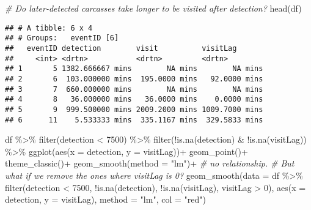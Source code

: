 \documentclass[
]{article}
\newenvironment{Shaded}{\begin{snugshade}}{\end{snugshade}}
\newcommand{\AttributeTok}[1]{\textcolor[rgb]{0.77,0.63,0.00}{#1}}
\newcommand{\CommentTok}[1]{\textcolor[rgb]{0.56,0.35,0.01}{\textit{#1}}}
\newcommand{\DecValTok}[1]{\textcolor[rgb]{0.00,0.00,0.81}{#1}}
\newcommand{\FunctionTok}[1]{\textcolor[rgb]{0.00,0.00,0.00}{#1}}
\newcommand{\NormalTok}[1]{#1}
\newcommand{\SpecialCharTok}[1]{\textcolor[rgb]{0.00,0.00,0.00}{#1}}
\newcommand{\StringTok}[1]{\textcolor[rgb]{0.31,0.60,0.02}{#1}}
\begin{document}
\begin{Shaded}
\begin{Highlighting}[]
\CommentTok{\# Do later{-}detected carcasses take longer to be visited after detection?}
\FunctionTok{head}\NormalTok{(df)}
\end{Highlighting}
\end{Shaded}

\begin{verbatim}
## # A tibble: 6 x 4
## # Groups:   eventID [6]
##   eventID detection        visit          visitLag      
##     <int> <drtn>           <drtn>         <drtn>        
## 1       5 1382.666667 mins        NA mins        NA mins
## 2       6  103.000000 mins  195.0000 mins   92.0000 mins
## 3       7  660.000000 mins        NA mins        NA mins
## 4       8   36.000000 mins   36.0000 mins    0.0000 mins
## 5       9  999.500000 mins 2009.2000 mins 1009.7000 mins
## 6      11    5.533333 mins  335.1167 mins  329.5833 mins
\end{verbatim}

\begin{Shaded}
\begin{Highlighting}[]
\NormalTok{df }\SpecialCharTok{\%\textgreater{}\%}
  \FunctionTok{filter}\NormalTok{(detection }\SpecialCharTok{\textless{}} \DecValTok{7500}\NormalTok{) }\SpecialCharTok{\%\textgreater{}\%}
  \FunctionTok{filter}\NormalTok{(}\SpecialCharTok{!}\FunctionTok{is.na}\NormalTok{(detection) }\SpecialCharTok{\&} \SpecialCharTok{!}\FunctionTok{is.na}\NormalTok{(visitLag)) }\SpecialCharTok{\%\textgreater{}\%}
  \FunctionTok{ggplot}\NormalTok{(}\FunctionTok{aes}\NormalTok{(}\AttributeTok{x =}\NormalTok{ detection, }\AttributeTok{y =}\NormalTok{ visitLag))}\SpecialCharTok{+}
  \FunctionTok{geom\_point}\NormalTok{()}\SpecialCharTok{+}
  \FunctionTok{theme\_classic}\NormalTok{()}\SpecialCharTok{+}
  \FunctionTok{geom\_smooth}\NormalTok{(}\AttributeTok{method =} \StringTok{"lm"}\NormalTok{)}\SpecialCharTok{+} \CommentTok{\# no relationship.}
  \CommentTok{\# But what if we remove the ones where visitLag is 0?}
  \FunctionTok{geom\_smooth}\NormalTok{(}\AttributeTok{data =}\NormalTok{ df }\SpecialCharTok{\%\textgreater{}\%}
                \FunctionTok{filter}\NormalTok{(detection }\SpecialCharTok{\textless{}} \DecValTok{7500}\NormalTok{, }\SpecialCharTok{!}\FunctionTok{is.na}\NormalTok{(detection), }\SpecialCharTok{!}\FunctionTok{is.na}\NormalTok{(visitLag), visitLag }\SpecialCharTok{\textgreater{}} \DecValTok{0}\NormalTok{),}
              \FunctionTok{aes}\NormalTok{(}\AttributeTok{x =}\NormalTok{ detection, }\AttributeTok{y =}\NormalTok{ visitLag), }\AttributeTok{method =} \StringTok{"lm"}\NormalTok{, }\AttributeTok{col =} \StringTok{"red"}\NormalTok{)}
\end{Highlighting}
\end{Shaded}
\end{document}
